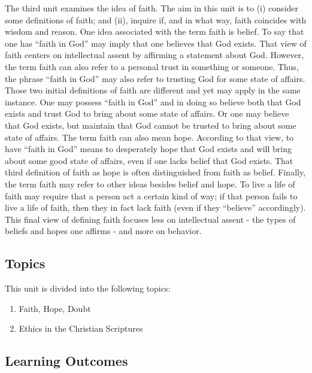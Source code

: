 \documentclass[
]{book}
\providecommand{\tightlist}{%
  \setlength{\itemsep}{0pt}\setlength{\parskip}{0pt}}
\begin{document}
The third unit examines the idea of faith. The aim in this unit is to (i) consider some definitions of faith; and (ii), inquire if, and in what way, faith coincides with wisdom and reason. One idea associated with the term faith is belief. To say that one has ``faith in God'' may imply that one believes that God exists. That view of faith centers on intellectual assent by affirming a statement about God. However, the term faith can also refer to a personal trust in something or someone. Thus, the phrase ``faith in God'' may also refer to trusting God for some state of affairs. Those two initial definitions of faith are different and yet may apply in the same instance. One may possess ``faith in God'' and in doing so believe both that God exists and trust God to bring about some state of affairs. Or one may believe that God exists, but maintain that God cannot be trusted to bring about some state of affairs. The term faith can also mean hope. According to that view, to have ``faith in God'' means to desperately hope that God exists and will bring about some good state of affairs, even if one lacks belief that God exists. That third definition of faith as hope is often distinguished from faith as belief. Finally, the term faith may refer to other ideas besides belief and hope. To live a life of faith may require that a person act a certain kind of way; if that person fails to live a life of faith, then they in fact lack faith (even if they ``believe'' accordingly). This final view of defining faith focuses less on intellectual assent - the types of beliefs and hopes one affirms - and more on behavior.

\hypertarget{topics-2}{%
\subsection*{Topics}\label{topics-2}}

This unit is divided into the following topics:

\begin{enumerate}
\def\labelenumi{\arabic{enumi}.}
\tightlist
\item
  Faith, Hope, Doubt\\
\item
  Ethics in the Christian Scriptures
\end{enumerate}

\hypertarget{learning-outcomes-2}{%
\subsection*{Learning Outcomes}\label{learning-outcomes-2}}
\end{document}
